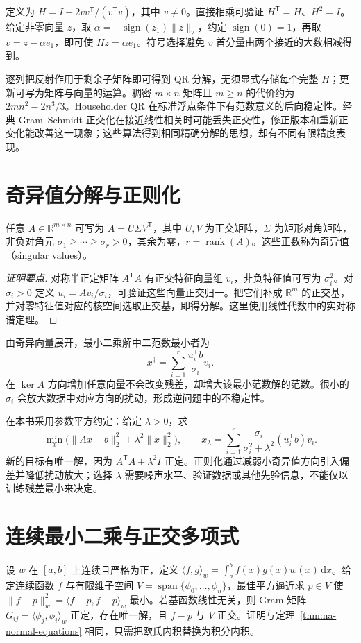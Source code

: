 \documentclass[UTF8,12pt,a4paper,fontset=fandol]{ctexbook}
\begin{document}
定义为 $H=I-2vv^{\mathsf T}/(v^{\mathsf T}v)$，其中 $v\ne0$。直接相乘可验证 $H^{\mathsf T}=H$、$H^2=I$。给定非零向量 $z$，取 $\alpha=-\operatorname{sign}(z_1)\|z\|_2$，约定 $\operatorname{sign}(0)=1$，再取 $v=z-\alpha e_1$，即可使 $Hz=\alpha e_1$。符号选择避免 $v$ 首分量由两个接近的大数相减得到。

逐列把反射作用于剩余子矩阵即可得到 QR 分解，无须显式存储每个完整 $H$；更新可写为矩阵与向量的运算。稠密 $m\times n$ 矩阵且 $m\ge n$ 的代价约为 $2mn^2-2n^3/3$。Householder QR 在标准浮点条件下有范数意义的后向稳定性。经典 Gram--Schmidt 正交化在接近线性相关时可能丢失正交性，修正版本和重新正交化能改善这一现象；这些算法得到相同精确分解的思想，却有不同有限精度表现。

\section{奇异值分解与正则化}
\begin{theorem}[奇异值分解的基本形式]
任意 $A\in\mathbb R^{m\times n}$ 可写为 $A=U\Sigma V^{\mathsf T}$，其中 $U,V$ 为正交矩阵，$\Sigma$ 为矩形对角矩阵，非负对角元 $\sigma_1\ge\cdots\ge\sigma_r>0$，其余为零，$r=\operatorname{rank}(A)$。这些正数称为奇异值（singular values）。
\end{theorem}
\begin{proof}[证明要点]
对称半正定矩阵 $A^{\mathsf T}A$ 有正交特征向量组 $v_i$，非负特征值可写为 $\sigma_i^2$。对 $\sigma_i>0$ 定义 $u_i=Av_i/\sigma_i$，可验证这些向量正交归一。把它们补成 $\mathbb R^m$ 的正交基，并对零特征值对应的核空间选取正交基，即得分解。这里使用线性代数中的实对称谱定理。
\end{proof}

由奇异向量展开，最小二乘解中二范数最小者为
\[
 x^\dagger=\sum_{i=1}^r\frac{u_i^{\mathsf T}b}{\sigma_i}v_i.
\]
在 $\ker A$ 方向增加任意向量不会改变残差，却增大该最小范数解的范数。很小的 $\sigma_i$ 会放大数据中对应方向的扰动，形成逆问题中的不稳定性。

在本书采用参数平方约定：给定 $\lambda>0$，求
\[
 \min_x\bigl(\|Ax-b\|_2^2+\lambda^2\|x\|_2^2\bigr),\qquad
 x_\lambda=\sum_{i=1}^r\frac{\sigma_i}{\sigma_i^2+\lambda^2}(u_i^{\mathsf T}b)v_i.
\]
新的目标有唯一解，因为 $A^{\mathsf T}A+\lambda^2I$ 正定。正则化通过减弱小奇异值方向引入偏差并降低扰动放大；选择 $\lambda$ 需要噪声水平、验证数据或其他先验信息，不能仅以训练残差最小来决定。

\section{连续最小二乘与正交多项式}
设 $w$ 在 $[a,b]$ 上连续且严格为正，定义 $\langle f,g\rangle_w=\int_a^b f(x)g(x)w(x)\,\mathrm dx$。给定连续函数 $f$ 与有限维子空间 $V=\operatorname{span}\{\phi_0,\ldots,\phi_n\}$，最佳平方逼近求 $p\in V$ 使 $\|f-p\|_w^2=\langle f-p,f-p\rangle_w$ 最小。若基函数线性无关，则 Gram 矩阵 $G_{ij}=\langle\phi_j,\phi_i\rangle_w$ 正定，存在唯一解，且 $f-p$ 与 $V$ 正交。证明与定理~\ref{thm:na-normal-equations} 相同，只需把欧氏内积替换为积分内积。
\end{document}
